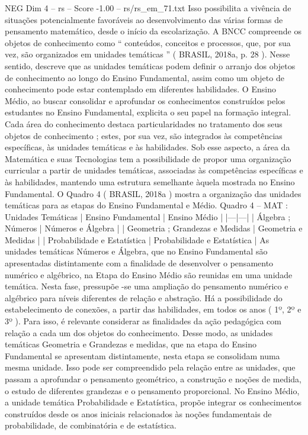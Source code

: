 \begin{textsample}{NEG Dim 4 – rs – Score -1.00 – rs/rs\_em\_71.txt}
Isso possibilita a vivência de situações potencialmente favoráveis ao desenvolvimento das várias formas de pensamento matemático, desde o início da escolarização.
A BNCC compreende os objetos de conhecimento como “ conteúdos, conceitos e processos, que, por sua vez, são organizados em unidades temáticas ” ( BRASIL, 2018a, p. 28 ).
Nesse sentido, descreve que as unidades temáticas podem definir o arranjo dos objetos de conhecimento ao longo do Ensino Fundamental, assim como um objeto de conhecimento pode estar contemplado em diferentes habilidades.
O Ensino Médio, ao buscar consolidar e aprofundar os conhecimentos construídos pelos estudantes no Ensino Fundamental, explicita o seu papel na formação integral.
Cada área do conhecimento destaca particularidades no tratamento dos seus objetos de conhecimento ; estes, por sua vez, são integrados às competências específicas, às unidades temáticas e às habilidades.
Sob esse aspecto, a área da Matemática e suas Tecnologias tem a possibilidade de propor uma organização curricular a partir de unidades temáticas, associadas às competências específicas e às habilidades, mantendo uma estrutura semelhante àquela mostrada no Ensino Fundamental.
O Quadro 4 ( BRASIL, 2018a ) mostra a organização das unidades temáticas para as etapas do Ensino Fundamental e Médio.
Quadro 4 – MAT : Unidades Temáticas | Ensino Fundamental | Ensino Médio | |---|---| | Álgebra ; Números | Números e Álgebra | | Geometria ; Grandezas e Medidas | Geometria e Medidas | | Probabilidade e Estatística | Probabilidade e Estatística | As unidades temáticas Números e Álgebra, que no Ensino Fundamental são apresentadas distintamente com a finalidade de desenvolver o pensamento numérico e algébrico, na Etapa do Ensino Médio são reunidas em uma unidade temática.
Nesta fase, pressupõe -se uma ampliação do pensamento numérico e algébrico para níveis diferentes de relação e abstração.
Há a possibilidade do estabelecimento de conexões, a partir das habilidades, em todos os anos ( 1º, 2º e 3º ).
Para isso, é relevante considerar as finalidades da ação pedagógica com relação a cada um dos objetos do conhecimento.
Desse modo, as unidades temáticas Geometria e Grandezas e medidas, que na etapa do Ensino Fundamental se apresentam distintamente, nesta etapa se consolidam numa mesma unidade.
Isso pode ser compreendido pela relação entre as unidades, que passam a aprofundar o pensamento geométrico, a construção e noções de medida, o estudo de diferentes grandezas e o pensamento proporcional.
No Ensino Médio, a unidade temática Probabilidade e Estatística, propõe integrar os conhecimentos construídos desde os anos iniciais relacionados às noções fundamentais de probabilidade, de combinatória e de estatística.

\end{textsample}
